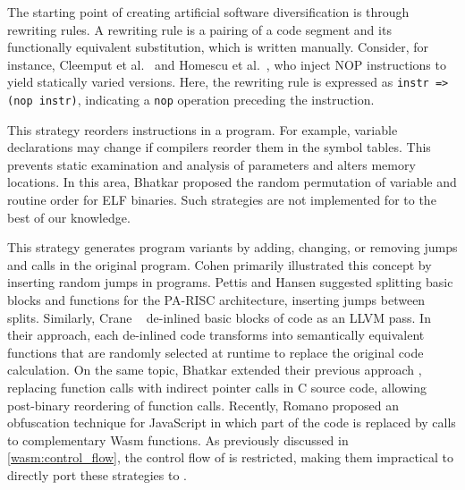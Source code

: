 The starting point of creating artificial software diversification is through rewriting rules.
A rewriting rule is a pairing of a code segment and its functionally equivalent substitution, which is written manually. 
Consider, for instance, Cleemput et al.~\cite{Cleemput2012} and Homescu et al.~\cite{homescu2013profile}, who inject NOP instructions to yield statically varied versions. 
Here, the rewriting rule is expressed as \texttt{instr => (nop instr)}, indicating a \texttt{nop} operation preceding the instruction.



This strategy reorders instructions in a program.
For example, variable declarations may change if compilers reorder them in the symbol tables. 
This prevents static examination and analysis of parameters and alters memory locations. 
In this area, Bhatkar \etal \cite{bhatkar03, bhatkar2005efficient} proposed the random permutation of variable and routine order for ELF binaries.
Such strategies are not implemented for \Wasm to the best of our knowledge.

This strategy generates program variants by adding, changing, or removing jumps and calls in the original program. Cohen \cite{cohen1993operating} primarily illustrated this concept by inserting random jumps in programs. Pettis and Hansen \cite{pettisochhansen} suggested splitting basic blocks and functions for the PA-RISC architecture, inserting jumps between splits.
Similarly, Crane \etal~\cite{crane2015thwarting} de-inlined basic blocks of code as an LLVM pass. 
In their approach, each de-inlined code transforms into semantically equivalent functions that are randomly selected at runtime to replace the original code calculation. 
On the same topic, Bhatkar \etal \cite{bhatkar2005efficient} extended their previous approach \cite{bhatkar03}, replacing function calls with indirect pointer calls in C source code, allowing post-binary reordering of function calls. 
Recently, Romano \etal \cite{wobfuscator} proposed an obfuscation technique for JavaScript in which part of the code is replaced by calls to complementary Wasm functions.
As previously discussed in \autoref{wasm:control_flow}, the control flow of \Wasm is restricted, making them impractical to directly port these strategies to \Wasm.

